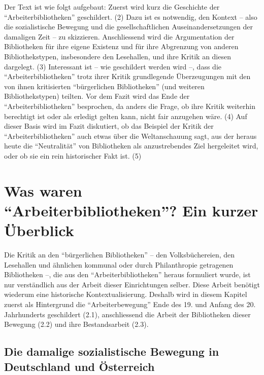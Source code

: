 \documentclass[a4paper,
fontsize=11pt,
oneside,
numbers=noperiodatend,
parskip=half-,
bibliography=totoc,
final
]{scrartcl}
\begin{document}
Der Text ist wie folgt aufgebaut: Zuerst wird kurz die Geschichte der
\enquote{Arbeiterbibliotheken} geschildert. (2) Dazu ist es notwendig,
den Kontext -- also die sozialistische Bewegung und die
gesellschaftlichen Auseinandersetzungen der damaligen Zeit -- zu
skizzieren. Anschliessend wird die Argumentation der Bibliotheken für
ihre eigene Existenz und für ihre Abgrenzung von anderen
Bibliothekstypen, insbesondere den Lesehallen, und ihre Kritik an diesen
dargelegt. (3) Interessant ist -- wie geschildert werden wird --, dass
die \enquote{Arbeiterbibliotheken} trotz ihrer Kritik grundlegende
Überzeugungen mit den von ihnen kritisierten \enquote{bürgerlichen
Bibliotheken} (und weiteren Bibliothekstypen) teilten. Vor dem Fazit
wird das Ende der \enquote{Arbeiterbibliotheken} besprochen, da anders
die Frage, ob ihre Kritik weiterhin berechtigt ist oder als erledigt
gelten kann, nicht fair anzugehen wäre. (4) Auf dieser Basis wird im
Fazit diskutiert, ob das Beispiel der Kritik der
\enquote{Arbeiterbibliotheken} auch etwas über die Weltanschauung sagt,
aus der heraus heute die \enquote{Neutralität} von Bibliotheken als
anzustrebendes Ziel hergeleitet wird, oder ob sie ein rein historischer
Fakt ist. (5)

\hypertarget{was-waren-arbeiterbibliotheken-ein-kurzer-uxfcberblick}{%
\section*{\texorpdfstring{Was waren \enquote{Arbeiterbibliotheken}?
Ein kurzer
Überblick}{Was waren ``Arbeiterbibliotheken''? Ein kurzer Überblick}}\label{was-waren-arbeiterbibliotheken-ein-kurzer-uxfcberblick}}

Die Kritik an den \enquote{bürgerlichen Bibliotheken} -- den
Volksbüchereien, den Lesehallen und ähnlichen kommunal oder durch
Philanthropie getragenen Bibliotheken --, die aus den
\enquote{Arbeiterbibliotheken} heraus formuliert wurde, ist nur
verständlich aus der Arbeit dieser Einrichtungen selber. Diese Arbeit
benötigt wiederum eine historische Kontextualisierung. Deshalb wird in
diesem Kapitel zuerst als Hintergrund die \enquote{Arbeiterbewegung}
Ende des 19. und Anfang des 20. Jahrhunderts geschildert (2.1),
anschliessend die Arbeit der Bibliotheken dieser Bewegung (2.2) und ihre
Bestandsarbeit (2.3).

\hypertarget{die-damalige-sozialistische-bewegung-in-deutschland-und-uxf6sterreich}{%
\subsection*{Die damalige sozialistische Bewegung in Deutschland und
Österreich}\label{die-damalige-sozialistische-bewegung-in-deutschland-und-uxf6sterreich}}
\end{document}
